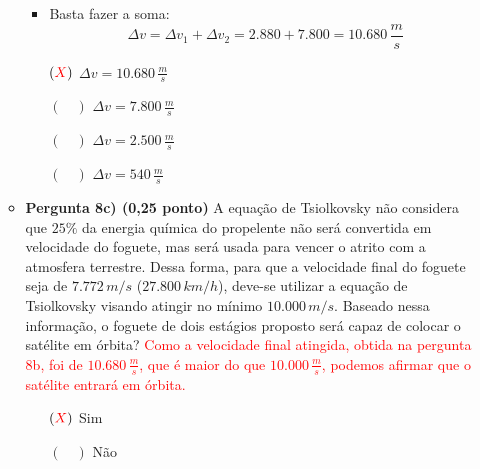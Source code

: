 \documentclass[a4paper, 12pt]{article}
\newcommand{\red}[1]{\textcolor{red}{#1}}
\begin{document}
\begin{flushleft}
\begin{itemize}
\begin{itemize}
{\begin{itemize}
                            \item Basta fazer a soma:
                                \begin{equation*}
                                    \Delta v = \Delta v_1+\Delta v_2=2.880+7.800=10.680 \, \frac{m}{s}
                                \end{equation*}
                        \end{itemize}}
                        \begin{itemize}
                            \item[$(\red{X})$] $\Delta v = 10.680 \, \frac{m}{s}$
                            \item[$(\quad)$] $\Delta v = 7.800 \, \frac{m}{s}$
                            \item[$(\quad)$] $\Delta v = 2.500 \, \frac{m}{s}$
                            \item[$(\quad)$] $\Delta v = 540 \, \frac{m}{s}$
                        \end{itemize}
                    \item \textbf{Pergunta 8c) (0,25 ponto)} A equação de Tsiolkovsky não considera que $25\%$ da energia química do propelente não será convertida em velocidade do foguete, mas será usada para vencer o atrito com a atmosfera terrestre. Dessa forma, para que a velocidade final do foguete seja de $7.772 \, m/s$ ($27.800 \, km/h$), deve-se utilizar a equação de Tsiolkovsky visando atingir no mínimo $10.000 \, m/s$. Baseado nessa informação, o foguete de dois estágios proposto será capaz de colocar o satélite em órbita?
                        \linebreak \red{Como a velocidade final atingida, obtida na pergunta 8b, foi de $10.680 \, \frac{m}{s}$, que é maior do que $10.000 \, \frac{m}{s}$, podemos afirmar que o satélite entrará em órbita.}
                        \begin{itemize}
                            \item[$(\red{X})$] Sim
                            \item[$(\quad)$] Não
                        \end{itemize}
                \end{itemize}
            

\end{itemize}
\end{flushleft}
\end{document}
